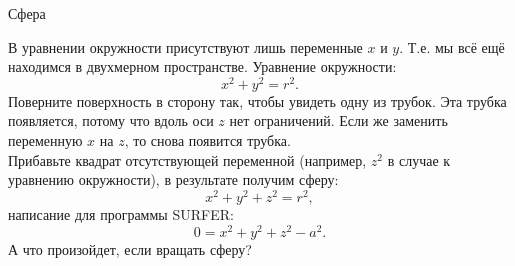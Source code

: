\documentclass[ru]{./../../common/SurferDesc}%
\begin{document}
\footnotesize
%
\begin{surferPage}
  \begin{surferTitle}Сфера\end{surferTitle}
   \begin{surferText}
   
В уравнении окружности присутствуют лишь переменные $x$ и $y$. Т.е. мы всё ещё находимся в двухмерном пространстве. Уравнение окружности: 
\[x^2+y^2=r^2.\]
Поверните поверхность в сторону так, чтобы увидеть одну из трубок. Эта трубка появляется, потому что вдоль оси $z$ нет ограничений. Если же заменить переменную $x$ на $z$, то снова появится трубка.\\
Прибавьте квадрат отсутствующей переменной (например, $z^2$ в случае к уравнению окружности), в результате получим сферу: 
\[x^2+y^2+z^2=r^2,\]
написание для программы SURFER:
\[0=x^2+y^2+z^2-a^2.\]
А что произойдет, если вращать сферу?

     \end{surferText}
\end{surferPage}
\end{document}
